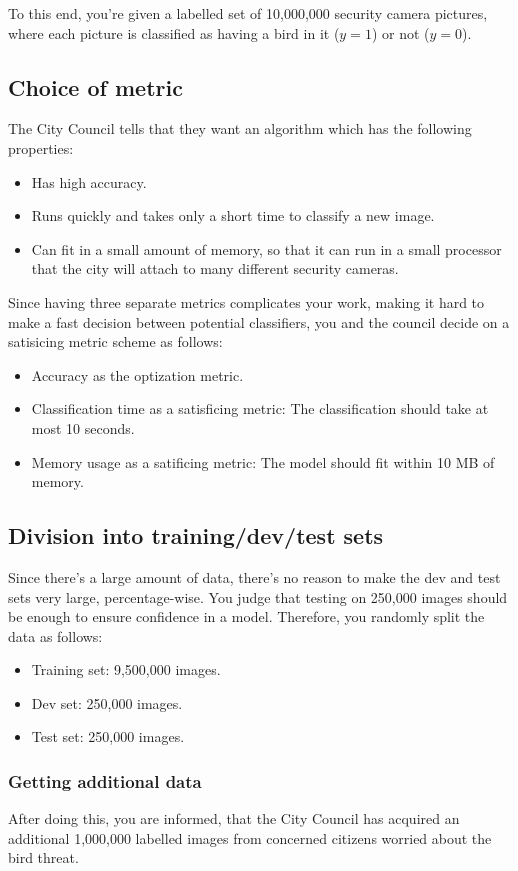 \documentclass[12pt, a4paper]{article}
\numberwithin{equation}{section}
\begin{document}
To this end, you're given a labelled set of 10,000,000 security camera pictures, where each picture is classified as having a bird in it ($y=1$) or not ($y=0$).

\subsection{Choice of metric}
The City Council tells that they want an algorithm which has the following properties:
\begin{itemize}
\item Has high accuracy.
\item Runs quickly and takes only a short time to classify a new image.
\item Can fit in a small amount of memory, so that it can run in a small processor that the city will attach to many different security cameras.
\end{itemize}
Since having three separate metrics complicates your work, making it hard to make a fast decision between potential classifiers, you and the council decide on a satisicing metric scheme as follows:
\begin{itemize}
\item Accuracy as the optization metric.
\item Classification time as a satisficing metric: The classification should take at most 10 seconds.
\item Memory usage as a satificing metric: The model should fit within 10 MB of memory.
\end{itemize}

\subsection{Division into training/dev/test sets}
Since there's a large amount of data, there's no reason to make the dev and test sets very large, percentage-wise. You judge that testing on 250,000 images should be enough to ensure confidence in a model. Therefore, you randomly split the data as follows:
\begin{itemize}
\item Training set: 9,500,000 images.
\item Dev set: 250,000 images.
\item Test set: 250,000 images.
\end{itemize}

\subsubsection{Getting additional data}
After doing this, you are informed, that the City Council has acquired an additional 1,000,000 labelled images from concerned citizens worried about the bird threat.
\end{document}
